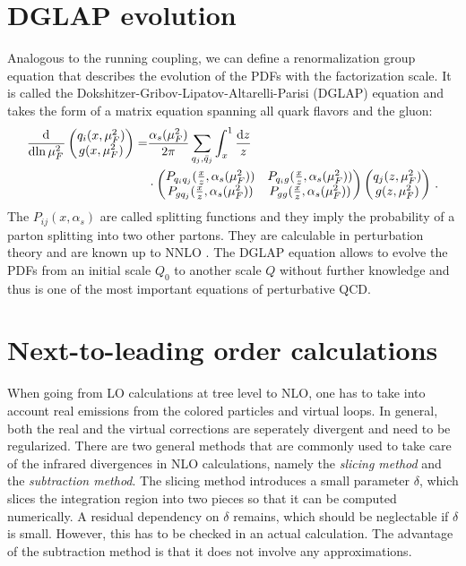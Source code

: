 \section{DGLAP evolution}
Analogous to the running coupling, we can define a renormalization group equation that describes the evolution of the PDFs with the factorization scale.
It is called the Dokshitzer-Gribov-Lipatov-Altarelli-Parisi (DGLAP) equation \cite{dglap1,dglap2,dglap3} and takes the form of a matrix equation spanning all quark flavors and the gluon:
%
\begin{align}
	\dod{}{\ln{\mu_F^2}} \begin{pmatrix} q_i(x,\mu_F^2) \\ g(x,\mu_F^2) \end{pmatrix} = &\frac{\alpha_s(\mu_F^2)}{2 \pi} \sum_{q_j,\bar q_j} \int_x^1 \frac{\dif z}{z} \nonumber \\
	&\cdot \begin{pmatrix}
		P_{q_i q_j}(\frac{x}{z},\alpha_s(\mu_F^2))	&	P_{q_i g}(\frac{x}{z},\alpha_s(\mu_F^2)) \\
		P_{g q_j}(\frac{x}{z},\alpha_s(\mu_F^2))	&	P_{gg}(\frac{x}{z},\alpha_s(\mu_F^2))
	\end{pmatrix}
	\begin{pmatrix} q_j(z,\mu_F^2) \\ g(z,\mu_F^2) \end{pmatrix} \, .
	\label{eq:dglap}
\end{align}
%
The $P_{i j}(x,\alpha_s)$ are called splitting functions and they imply the probability of a parton splitting into two other partons.
They are calculable in perturbation theory and are known up to NNLO \cite{splittingkernel1,splittingkernel2}.
The DGLAP equation allows to evolve the PDFs from an initial scale $Q_0$ to another scale $Q$ without further knowledge and thus is one of the most important equations of perturbative QCD.
%
\section{Next-to-leading order calculations}
\label{sec:nlo_calculations}
When going from LO calculations at tree level to NLO, one has to take into account real emissions from the colored particles and virtual loops.
In general, both the real and the virtual corrections are seperately divergent and need to be regularized.
There are two general methods that are commonly used to take care of the infrared divergences in NLO calculations, namely the \textit{slicing method} and the \textit{subtraction method}.
The slicing method introduces a small parameter $\delta$, which slices the integration region into two pieces so that it can be computed numerically.
A residual dependency on $\delta$ remains, which should be neglectable if $\delta$ is small.
However, this has to be checked in an actual calculation.
The advantage of the subtraction method is that it does not involve any approximations.

